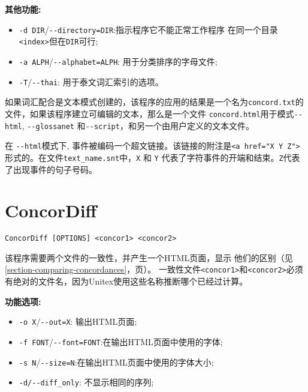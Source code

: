 \bigskip
\noindent \textbf{其他功能:}
\begin{itemize}
\item \verb+-d DIR+/\verb+--directory=DIR+:指示程序它不能正常工作程序
在同一个目录\verb+<index>+但在\verb+DIR+可行; 

  \item \verb+-a ALPH+/\verb+--alphabet=ALPH+: 用于分类排序的字母文件;
  \item \verb+-T+/\verb+--thai+: 用于泰文词汇索引的选项。
\end{itemize}

\bigskip
\noindent 如果词汇配合是文本模式创建的，该程序的应用的结果是一个名为\verb+concord.txt+的文件，如果该程序建立可编辑的文本，那么是一个文件 \verb+concord.html+用于模式\verb+--html+, \verb+--glossanet+ 和\verb$--script$，和另一个由用户定义的文本文件。



\bigskip
\noindent 在 \verb+--html+模式下, 事件被编码一个超文链接。该链接的附注是\verb+<a href="X Y Z">+形式的。在文件\verb+text_name.snt+中，\verb+X+ 和 \verb+Y+ 代表了字符事件的开端和结束。\verb+Z+代表了出现事件的句子号码。






\section{ConcorDiff}
\verb+ConcorDiff [OPTIONS] <concor1> <concor2>+

\bigskip
\noindent 该程序需要两个文件的一致性，并产生一个HTML页面，显示
他们的区别（见\ref{section-comparing-concordances}，\pageref{section-comparing-concordances}页）。 一致性文件\verb+<concor1>+和\verb+<concor2>+必须有绝对的文件名，因为Unitex使用这些名称推断哪个已经过计算。


\bigskip
\noindent \textbf{功能选项:}
\begin{itemize}
  \item \verb+-o X+/\verb+--out=X+: 输出HTML页面;
  \item \verb+-f FONT+/\verb+--font=FONT+:在输出HTML页面中使用的字体;
  \item \verb+-s N+/\verb+--size=N+:在输出HTML页面中使用的字体大小;
  \item \verb+-d/--diff_only+: 不显示相同的序列;
\end{itemize}







